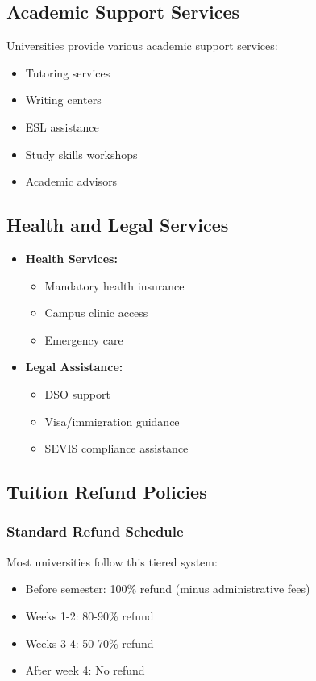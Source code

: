 \subsection{Academic Support Services}
Universities provide various academic support services:
\begin{itemize}
    \item Tutoring services
    \item Writing centers
    \item ESL assistance
    \item Study skills workshops
    \item Academic advisors
\end{itemize}

\subsection{Health and Legal Services}
\begin{itemize}
    \item \textbf{Health Services:}
    \begin{itemize}
        \item Mandatory health insurance
        \item Campus clinic access
        \item Emergency care
    \end{itemize}
    
    \item \textbf{Legal Assistance:}
    \begin{itemize}
        \item DSO support
        \item Visa/immigration guidance
        \item SEVIS compliance assistance
    \end{itemize}
\end{itemize}

\subsection{Tuition Refund Policies}
\subsubsection{Standard Refund Schedule}
Most universities follow this tiered system:
\begin{itemize}
    \item Before semester: 100\% refund (minus administrative fees)
    \item Weeks 1-2: 80-90\% refund
    \item Weeks 3-4: 50-70\% refund
    \item After week 4: No refund
\end{itemize}

